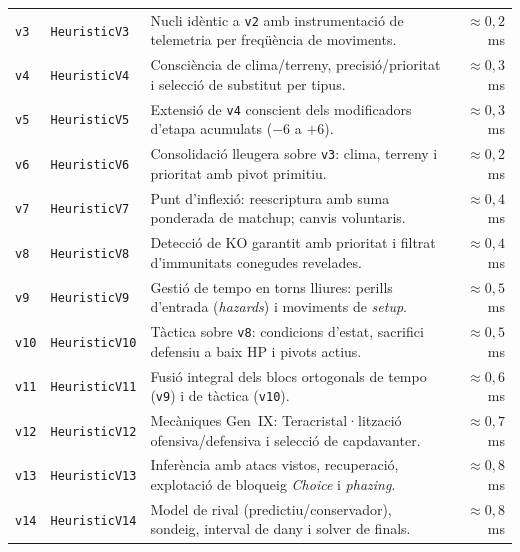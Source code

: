 \begin{table}[htbp]
\begin{tabularx}{\textwidth}{lp{4.0cm}>{\raggedright\arraybackslash}X r}
\arrayrulecolor{gray!30}\hline\arrayrulecolor{black}
\texttt{v3} & \texttt{HeuristicV3} & Nucli idèntic a \texttt{v2} amb instrumentació de telemetria per freqüència de moviments. & $\approx 0{,}2$~ms \\
\arrayrulecolor{gray!30}\hline\arrayrulecolor{black}
\texttt{v4} & \texttt{HeuristicV4} & Consciència de clima/terreny, precisió/prioritat i selecció de substitut per tipus. & $\approx 0{,}3$~ms \\
\arrayrulecolor{gray!30}\hline\arrayrulecolor{black}
\texttt{v5} & \texttt{HeuristicV5} & Extensió de \texttt{v4} conscient dels modificadors d'etapa acumulats ($-6$ a $+6$). & $\approx 0{,}3$~ms \\
\arrayrulecolor{gray!30}\hline\arrayrulecolor{black}
\texttt{v6} & \texttt{HeuristicV6} & Consolidació lleugera sobre \texttt{v3}: clima, terreny i prioritat amb pivot primitiu. & $\approx 0{,}2$~ms \\
\arrayrulecolor{gray!30}\hline\arrayrulecolor{black}
\texttt{v7} & \texttt{HeuristicV7} & Punt d'inflexió: reescriptura amb suma ponderada de matchup; canvis voluntaris. & $\approx 0{,}4$~ms \\
\arrayrulecolor{gray!30}\hline\arrayrulecolor{black}
\texttt{v8} & \texttt{HeuristicV8} & Detecció de KO garantit amb prioritat i filtrat d'immunitats conegudes revelades. & $\approx 0{,}4$~ms \\
\arrayrulecolor{gray!30}\hline\arrayrulecolor{black}
\texttt{v9} & \texttt{HeuristicV9} & Gestió de tempo en torns lliures: perills d'entrada (\emph{hazards}) i moviments de \emph{setup}. & $\approx 0{,}5$~ms \\
\arrayrulecolor{gray!30}\hline\arrayrulecolor{black}
\texttt{v10} & \texttt{HeuristicV10} & Tàctica sobre \texttt{v8}: condicions d'estat, sacrifici defensiu a baix HP i pivots actius. & $\approx 0{,}5$~ms \\
\arrayrulecolor{gray!30}\hline\arrayrulecolor{black}
\texttt{v11} & \texttt{HeuristicV11} & Fusió integral dels blocs ortogonals de tempo (\texttt{v9}) i de tàctica (\texttt{v10}). & $\approx 0{,}6$~ms \\
\arrayrulecolor{gray!30}\hline\arrayrulecolor{black}
\texttt{v12} & \texttt{HeuristicV12} & Mecàniques Gen~IX: Teracristal·lització ofensiva/defensiva i selecció de capdavanter. & $\approx 0{,}7$~ms \\
\arrayrulecolor{gray!30}\hline\arrayrulecolor{black}
\texttt{v13} & \texttt{HeuristicV13} & Inferència amb atacs vistos, recuperació, explotació de bloqueig \emph{Choice} i \emph{phazing}. & $\approx 0{,}8$~ms \\
\arrayrulecolor{gray!30}\hline\arrayrulecolor{black}
\texttt{v14} & \texttt{HeuristicV14} & Model de rival (predictiu/conservador), sondeig, interval de dany i solver de finals. & $\approx 0{,}8$~ms \\
\bottomrule
\end{tabularx}
\end{table}

